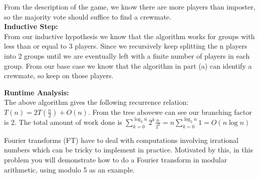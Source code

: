 \documentclass[11pt]{article}
\begin{document}
\begin{subparts}
\begin{solution}
\begin{center}
            From the description of the game, we know there are more players than imposter, so the majority vote should suffice to find a crewmate.\\
            \textbf{Inductive Step: }\\
            From our inductive hypothesis we know that the algorithm works for groups with less than or equal to 3 players.
            Since we recursively keep splitting the n players into 2 groups until we are eventually left with a finite number of players in each group.
            From our base case we know that the algorithm in part (a) can identify a crewmate, so keep on those players.
        \end{center}
        \textbf{Runtime Analysis: }\\
        The above algorithm gives the following recurrence relation: $T(n) = 2T(\frac{n}{2}) + O(n)$. From the tree abovewe can
        see our branching factor is 2. The total amount of work done is $\sum_{k = 0}^{\log_2n}2^k\frac{n}{2^k} = n\sum_{k = 0}^{\log_2n}1 = O(n\log n)$
    \end{solution}
\end{subparts}
\newpage
{}
Fourier transforms (FT) have to deal with computations involving irrational numbers which can be tricky to implement in practice.
Motivated by this, in this problem you will demonstrate how to do a Fourier transform in modular arithmetic,
using modulo 5 as an example.
\end{document}
